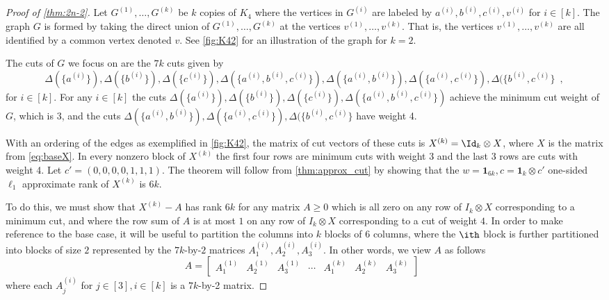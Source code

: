 \begin{proof}[Proof of \cref{thm:2n-2}]
Let $G^{(1)}, \ldots, G^{(k)}$ be $k$ copies of $K_4$ where the vertices in $G^{(i)}$ are labeled by $a^{(i)}, b^{(i)}, c^{(i)}, v^{(i)}$ for $i \in [k]$.
The graph $G$ is formed by taking the direct union of $G^{(1)}, \ldots, G^{(k)}$ at the vertices $v^{(1)}, \ldots, v^{(k)}$.  That is,
the vertices $v^{(1)}, \ldots, v^{(k)}$ are all identified by a common vertex denoted $v$.  See \cref{fig:K42} for an illustration of the graph
for $k=2$.

The cuts of $G$ we focus on are the $7k$ cuts given by
\[
\Delta(\{a^{(i)}\}), \Delta(\{b^{(i)}\}), \Delta(\{c^{(i)}\}), \Delta(\{a^{(i)},b^{(i)},c^{(i)}\}), \Delta(\{a^{(i)},b^{(i)}\}), \Delta(\{a^{(i)},c^{(i)}\}), \Delta(\{b^{(i)},c^{(i)}\} \enspace,
\]
for $i \in [k]$.  For any $i \in [k]$ the cuts $\Delta(\{a^{(i)}\}), \Delta(\{b^{(i)}\}), \Delta(\{c^{(i)}\}), \Delta(\{a^{(i)},b^{(i)},c^{(i)}\})$ achieve the minimum cut weight of $G$, which is 3,
and the cuts $\Delta(\{a^{(i)},b^{(i)}\}), \Delta(\{a^{(i)},c^{(i)}\}), \Delta(\{b^{(i)},c^{(i)}\}$ have weight 4.

With an ordering of the edges as exemplified in \cref{fig:K42}, the matrix of cut vectors of these cuts is $X^{(k)} = \Id_k \otimes X$,
where $X$ is the matrix from \cref{eq:baseX}.  In every nonzero block of $X^{(k)}$ the first four rows are minimum cuts with weight 3 and the last 3 rows are cuts with weight 4.
Let $c' = (0,0,0,0,1,1,1)$.  The theorem will follow from \cref{thm:approx_cut} by showing that the $w = \mathbf{1}_{6k}, c = \mathbf{1}_k \otimes c'$ one-sided $\ell_1$ approximate
rank of $X^{(k)}$ is $6k$.

To do this, we must show that $X^{(k)} - A$ has rank $6k$ for any matrix $A \ge 0$ which is all zero on any row of $I_k \otimes X$ corresponding
to a minimum cut, and where the row sum of $A$ is at most $1$ on any row of $I_k \otimes X$ corresponding to a cut of weight $4$.
In order to make reference to the base case, it will be useful to partition the columns into $k$ blocks of $6$ columns, where the $\ith$ block
is further partitioned into blocks of size $2$ represented by the $7k$-by-$2$ matrices $A_1^{(i)}, A_2^{(i)},A_3^{(i)}$.  In other words, we view
$A$ as follows
\[
A =
\begin{bmatrix}
A_1^{(1)} & A_2^{(1)} & A_3^{(1)} & \cdots & A_1^{(k)} & A_2^{(k)} & A_3^{(k)}
\end{bmatrix}
\enspace
\]
where each $A_j^{(i)}$ for $j \in [3], i \in [k]$ is a $7k$-by-2 matrix.


\end{proof}

